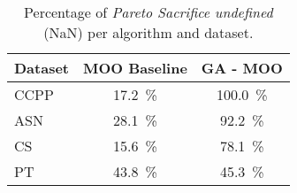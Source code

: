 \begin{table}[ht]
\centering
\caption{Percentage of \textit{Pareto Sacrifice undefined} (NaN) per algorithm and dataset.}
\label{tab:pareto_sacrifice_undefined_moo baselinega - moo}
\begin{tabular}{lcc}
\hline
Dataset & MOO Baseline & GA - MOO \\
\hline
CCPP & 17.2~\% & 100.0~\% \\
ASN & 28.1~\% & 92.2~\% \\
CS & 15.6~\% & 78.1~\% \\
PT & 43.8~\% & 45.3~\% \\
\hline
\end{tabular}
\end{table}